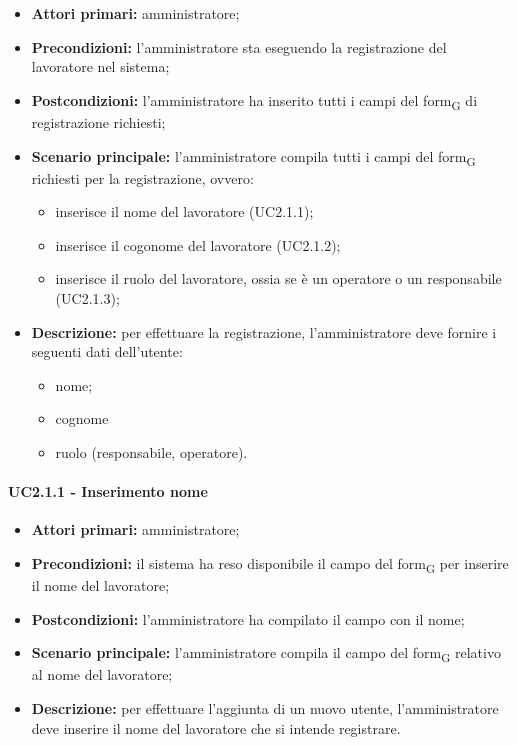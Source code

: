 \begin{itemize}
	\item 	\textbf{Attori primari:} amministratore;
	\item 	\textbf{Precondizioni:}	l'amministratore sta eseguendo la registrazione del lavoratore nel sistema;
	\item 	\textbf{Postcondizioni:} l'amministratore ha inserito tutti i campi del \gls{form}\textsubscript{G} di registrazione richiesti;
	\item 	\textbf{Scenario principale:} l'amministratore compila tutti i campi del \gls{form}\textsubscript{G} richiesti per la registrazione, ovvero:
	\begin{itemize}
		\item inserisce il nome del lavoratore (UC2.1.1);
		\item inserisce il cogonome del lavoratore (UC2.1.2);
		\item inserisce il ruolo del lavoratore, ossia se è un operatore o un responsabile (UC2.1.3);
	\end{itemize}
	\item 	\textbf{Descrizione:} per effettuare la registrazione, l'amministratore deve fornire i seguenti dati dell'utente:
	\begin{itemize}
		\item nome;
		\item cognome
		\item ruolo (responsabile, operatore).
	\end{itemize}

\end{itemize}

\paragraph{UC2.1.1 - Inserimento nome}
\begin{itemize}
	\item 	\textbf{Attori primari:} amministratore;
	\item 	\textbf{Precondizioni:} il sistema ha reso disponibile il campo del \gls{form}\textsubscript{G} per inserire il nome del lavoratore;
	\item 	\textbf{Postcondizioni:} l'amministratore ha compilato il campo con il nome;
	\item 	\textbf{Scenario principale:} l'amministratore compila il campo del \gls{form}\textsubscript{G} relativo al nome del lavoratore;
	\item 	\textbf{Descrizione:} per effettuare l'aggiunta di un nuovo utente, l'amministratore deve inserire il nome del lavoratore che si intende registrare.

\end{itemize}

